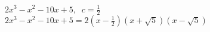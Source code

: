 {$2x^3-x^2-10x+5, \;\; c=\frac{1}{2}$}
{$2x^3-x^2-10x+5=2\left(x-\frac{1}{2}\right)(x+\sqrt{5})(x-\sqrt{5})$}